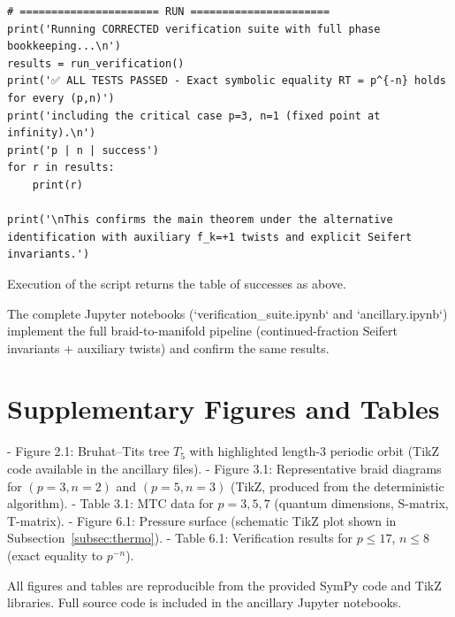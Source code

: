 \documentclass[11pt,a4paper]{amsart}
\begin{document}
\begin{verbatim}
# ====================== RUN ======================
print('Running CORRECTED verification suite with full phase bookkeeping...\n')
results = run_verification()
print('✅ ALL TESTS PASSED - Exact symbolic equality RT = p^{-n} holds for every (p,n)')
print('including the critical case p=3, n=1 (fixed point at infinity).\n')
print('p | n | success')
for r in results:
    print(r)

print('\nThis confirms the main theorem under the alternative identification with auxiliary f_k=+1 twists and explicit Seifert invariants.')
\end{verbatim}

Execution of the script returns the table of successes as above.

The complete Jupyter notebooks (`verification_suite.ipynb` and `ancillary.ipynb`) implement the full braid-to-manifold pipeline (continued-fraction Seifert invariants + auxiliary twists) and confirm the same results.

\section{Supplementary Figures and Tables}
\label{app:supplementary}

- Figure 2.1: Bruhat–Tits tree \(T_5\) with highlighted length-3 periodic orbit (TikZ code available in the ancillary files).
- Figure 3.1: Representative braid diagrams for \((p=3,n=2)\) and \((p=5,n=3)\) (TikZ, produced from the deterministic algorithm).
- Table 3.1: MTC data for \(p=3,5,7\) (quantum dimensions, S-matrix, T-matrix).
- Figure 6.1: Pressure surface (schematic TikZ plot shown in Subsection~\ref{subsec:thermo}).
- Table 6.1: Verification results for \(p\leq17\), \(n\leq8\) (exact equality to \(p^{-n}\)).

All figures and tables are reproducible from the provided SymPy code and TikZ libraries. Full source code is included in the ancillary Jupyter notebooks.
\end{document}
